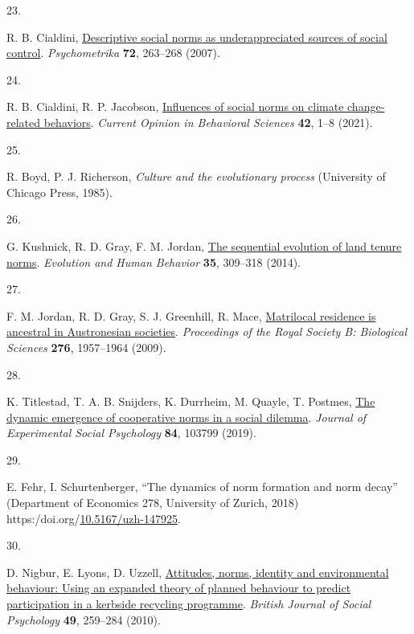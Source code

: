 \documentclass[
  man, donotrepeattitle,floatsintext]{apa6}
\newlength{\cslhangindent}
\newlength{\csllabelwidth}
\newlength{\cslentryspacingunit} %
\newenvironment{CSLReferences}[2] %
 {%
  \setlength{\parindent}{0pt}
  \ifodd #1
  \let\oldpar\par
  \def\par{\hangindent=\cslhangindent\oldpar}
  \fi
  \setlength{\parskip}{#2\cslentryspacingunit}
 }%
 {}
\newcommand{\CSLLeftMargin}[1]{\parbox[t]{\csllabelwidth}{#1}}
\newcommand{\CSLRightInline}[1]{\parbox[t]{\linewidth - \csllabelwidth}{#1}\break}
\begin{document}
\begin{CSLReferences}{0}{0}
\leavevmode{}%
\CSLLeftMargin{23. }%
\CSLRightInline{R. B. Cialdini, \href{https://doi.org/10.1007/s11336-006-1560-6}{Descriptive social norms as underappreciated sources of social control}. \emph{Psychometrika} \textbf{72}, 263--268 (2007).}

\leavevmode{}%
\CSLLeftMargin{24. }%
\CSLRightInline{R. B. Cialdini, R. P. Jacobson, \href{https://doi.org/10.1016/j.cobeha.2021.01.005}{Influences of social norms on climate change-related behaviors}. \emph{Current Opinion in Behavioral Sciences} \textbf{42}, 1--8 (2021).}

\leavevmode{}%
\CSLLeftMargin{25. }%
\CSLRightInline{R. Boyd, P. J. Richerson, \emph{Culture and the evolutionary process} (University of Chicago Press, 1985).}

\leavevmode{}%
\CSLLeftMargin{26. }%
\CSLRightInline{G. Kushnick, R. D. Gray, F. M. Jordan, \href{https://doi.org/10.1016/j.evolhumbehav.2014.03.001}{The sequential evolution of land tenure norms}. \emph{Evolution and Human Behavior} \textbf{35}, 309--318 (2014).}

\leavevmode{}%
\CSLLeftMargin{27. }%
\CSLRightInline{F. M. Jordan, R. D. Gray, S. J. Greenhill, R. Mace, \href{https://doi.org/10.1098/rspb.2009.0088}{Matrilocal residence is ancestral in {A}ustronesian societies}. \emph{Proceedings of the Royal Society B: Biological Sciences} \textbf{276}, 1957--1964 (2009).}

\leavevmode{}%
\CSLLeftMargin{28. }%
\CSLRightInline{K. Titlestad, T. A. B. Snijders, K. Durrheim, M. Quayle, T. Postmes, \href{https://doi.org/10.1016/j.jesp.2019.03.010}{The dynamic emergence of cooperative norms in a social dilemma}. \emph{Journal of Experimental Social Psychology} \textbf{84}, 103799 (2019).}

\leavevmode{}%
\CSLLeftMargin{29. }%
\CSLRightInline{E. Fehr, I. Schurtenberger, {``The dynamics of norm formation and norm decay''} (Department of Economics 278, University of Zurich, 2018) https:/doi.org/\href{https://doi.org/10.5167/uzh-147925}{10.5167/uzh-147925}.}

\leavevmode{}%
\CSLLeftMargin{30. }%
\CSLRightInline{D. Nigbur, E. Lyons, D. Uzzell, \href{https://doi.org/10.1348/014466609X449395}{Attitudes, norms, identity and environmental behaviour: Using an expanded theory of planned behaviour to predict participation in a kerbside recycling programme}. \emph{British Journal of Social Psychology} \textbf{49}, 259--284 (2010).}


\end{CSLReferences}
\end{document}
